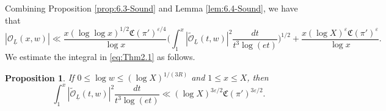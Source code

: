 \documentclass[12pt,reqno]{amsart}
\newtheorem{prop}[thm]{Proposition}
\theoremstyle{remark}
\numberwithin{equation}{section}
\begin{document}
 
	Combining Proposition \ref{prop:6.3-Sound} and Lemma \ref{lem:6.4-Sound}, we have that
	\begin{equation}\label{eq:Thm2.1}
		|\mathcal{O}_{\underline{L}}(x,w)|\ll \frac{x(\log\log x)^{1/2}\mathfrak{C}(\pi')^{\varepsilon/4}}{\log x}  \Big(\int_1^x |\widetilde{\mathcal{O}}_{\underline{L}}(t,w)|^2 \frac{dt}{t^3\log(et)} \Big)^{1/2} +\frac{x (\log X)^\varepsilon\mathfrak{C}(\pi')^\varepsilon}{\log x}.
	\end{equation}
	We estimate the integral in \eqref{eq:Thm2.1} as follows. 
	
	\begin{prop}\label{prop:6.5-Sound} 
		If $0 \le \log w \le (\log X)^{1/(3R)}$ and $1 \le x \le X$, then 
		\begin{equation*}
			\int_1^x|\widetilde{\mathcal{O}}_{\underline{L}}(t,w)|^{2} \frac{dt}{t^3\log(et)} \ll (\log X)^{3\varepsilon/2}\mathfrak{C}(\pi')^{3\varepsilon/2}.
		\end{equation*}
	\end{prop}
	
\end{document}
